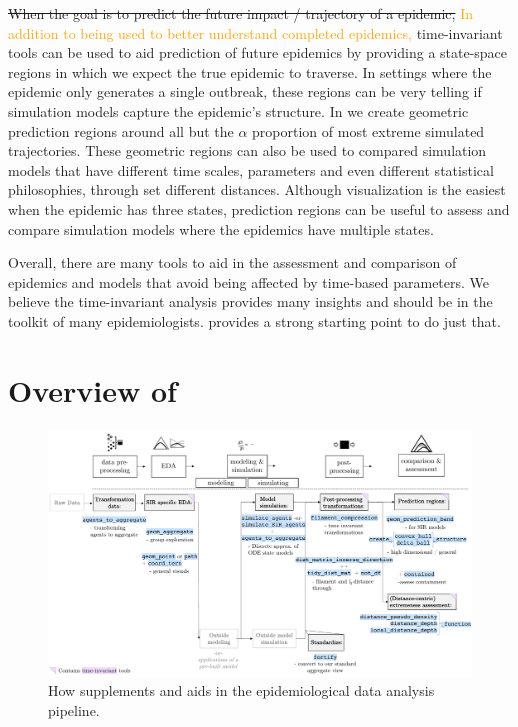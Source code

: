 \documentclass[
  shortnames]{jss}
\begin{document}
\sout{When the goal is to predict the future impact / trajectory of a epidemic,}
\textcolor{orange}{In addition to being used to better understand completed epidemics,}
time-invariant tools can be used to aid prediction of future epidemics
by providing a state-space regions in which we expect the true epidemic
to traverse. In settings where the epidemic only generates a single
outbreak, these regions can be very telling if simulation models capture
the epidemic's structure. In  we create geometric
prediction regions around all but the \(\alpha\) proportion of most
extreme simulated trajectories. These geometric regions can also be used
to compared simulation models that have different time scales,
parameters and even different statistical philosophies, through set
different distances. Although visualization is the easiest when the
epidemic has three states, prediction regions can be useful to assess
and compare simulation models where the epidemics have multiple states.

Overall, there are many tools to aid in the assessment and comparison of
epidemics and models that avoid being affected by time-based parameters.
We believe the time-invariant analysis provides many insights and should
be in the toolkit of many epidemiologists.  provides a
strong starting point to do just that.

\section[Package overview]{Overview of
}\label{sec:overview}

\afterpage{\clearpage}
\begin{figure}
    \centering
    \includegraphics[width = 1\textwidth]{images/pipeline2_1.pdf}
    \caption{How  supplements and aids in the epidemiological data analysis pipeline.}
    \label{fig:pipeline2}
\end{figure}
\end{document}
